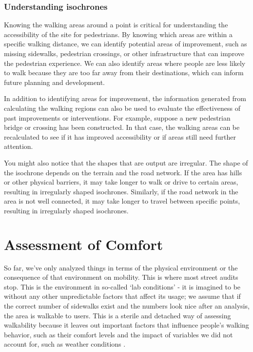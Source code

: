 \documentclass[
]{latex/krantz}
\begin{document}
\hypertarget{understanding-isochrones}{%
\subsubsection{Understanding isochrones}\label{understanding-isochrones}}

Knowing the walking areas around a point is critical for understanding the accessibility of the site for pedestrians. By knowing which areas are within a specific walking distance, we can identify potential areas of improvement, such as missing sidewalks, pedestrian crossings, or other infrastructure that can improve the pedestrian experience. We can also identify areas where people are less likely to walk because they are too far away from their destinations, which can inform future planning and development.

In addition to identifying areas for improvement, the information generated from calculating the walking regions can also be used to evaluate the effectiveness of past improvements or interventions. For example, suppose a new pedestrian bridge or crossing has been constructed. In that case, the walking areas can be recalculated to see if it has improved accessibility or if areas still need further attention.

You might also notice that the shapes that are output are irregular. The shape of the isochrone depends on the terrain and the road network. If the area has hills or other physical barriers, it may take longer to walk or drive to certain areas, resulting in irregularly shaped isochrones. Similarly, if the road network in the area is not well connected, it may take longer to travel between specific points, resulting in irregularly shaped isochrones.

\hypertarget{assessment-of-comfort}{%
\section{Assessment of Comfort}\label{assessment-of-comfort}}

So far, we've only analyzed things in terms of the physical environment or the consequence of that environment on mobility. This is where most street audits stop. This is the environment in so-called `lab conditions' - it is imagined to be without any other unpredictable factors that affect its usage; we assume that if the correct number of sidewalks exist and the numbers look nice after an analysis, the area is walkable to users. This is a sterile and detached way of assessing walkability because it leaves out important factors that influence people's walking behavior, such as their comfort levels and the impact of variables we did not account for, such as weather conditions \autocite{tongDevelopingMultiscaleWalkability}.
\end{document}
